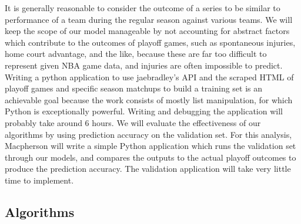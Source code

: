 \documentclass[letterpaper]{article} %
\begin{document}
It is generally reasonable to consider the outcome of a series to be similar to performance of a team during the regular season against various teams. We will keep the scope of our model manageable by not accounting for abstract factors which contribute to the outcomes of playoff games, such as spontaneous injuries, home court advantage, and the like, because these are far too difficult to represent given NBA game data, and injuries are often impossible to predict. Writing a python application to use jaebradley's API and the scraped HTML of playoff games and specific season matchups to build a training set is an achievable goal because the work consists of mostly list manipulation, for which Python is exceptionally powerful. Writing and debugging the application will probably take around 6 hours. We will evaluate the effectiveness of our algorithms by using prediction accuracy on the validation set. For this analysis, Macpherson will write a simple Python application which runs the validation set through our models, and compares the outputs to the actual playoff outcomes to produce the prediction accuracy. The validation application will take very little time to implement.

\subsection{Algorithms}
\end{document}
